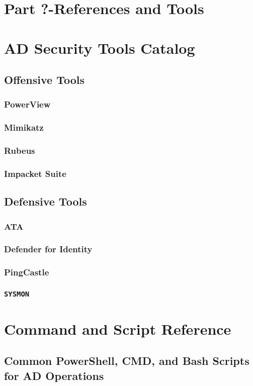 \documentclass{article}
\begin{document}
\section{Part ?-References and Tools}
\section{AD Security Tools Catalog}
\subsection{Offensive Tools}
\subsubsection{PowerView}
\subsubsection{Mimikatz}
\subsubsection{Rubeus}
\subsubsection{Impacket Suite}
\subsection{Defensive Tools}
\subsubsection{ATA}
\subsubsection{Defender for Identity}
\subsubsection{PingCastle}
\subsubsection{\texttt{SYSMON}}

\section{Command and Script Reference}
\subsection{Common PowerShell, CMD, and Bash Scripts for AD Operations}
\end{document}
